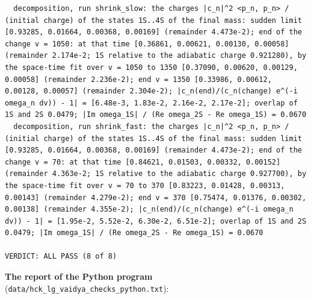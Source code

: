 \documentclass[
  10pt,
]{article}
\begin{document}
\begin{verbatim}
  decomposition, run shrink_slow: the charges |c_n|^2 <p_n, p_n> / (initial charge) of the states 1S..4S of the final mass: sudden limit [0.93285, 0.01664, 0.00368, 0.00169] (remainder 4.473e-2); end of the change v = 1050: at that time [0.36861, 0.00621, 0.00130, 0.00058] (remainder 2.174e-2; 1S relative to the adiabatic charge 0.921280), by the space-time fit over v = 1050 to 1350 [0.37090, 0.00620, 0.00129, 0.00058] (remainder 2.236e-2); end v = 1350 [0.33986, 0.00612, 0.00128, 0.00057] (remainder 2.304e-2); |c_n(end)/(c_n(change) e^(-i omega_n dv)) - 1| = [6.48e-3, 1.83e-2, 2.16e-2, 2.17e-2]; overlap of 1S and 2S 0.0479; |Im omega_1S| / (Re omega_2S - Re omega_1S) = 0.0670
  decomposition, run shrink_fast: the charges |c_n|^2 <p_n, p_n> / (initial charge) of the states 1S..4S of the final mass: sudden limit [0.93285, 0.01664, 0.00368, 0.00169] (remainder 4.473e-2); end of the change v = 70: at that time [0.84621, 0.01503, 0.00332, 0.00152] (remainder 4.363e-2; 1S relative to the adiabatic charge 0.927700), by the space-time fit over v = 70 to 370 [0.83223, 0.01428, 0.00313, 0.00143] (remainder 4.279e-2); end v = 370 [0.75474, 0.01376, 0.00302, 0.00138] (remainder 4.355e-2); |c_n(end)/(c_n(change) e^(-i omega_n dv)) - 1| = [1.95e-2, 5.52e-2, 6.30e-2, 6.51e-2]; overlap of 1S and 2S 0.0479; |Im omega_1S| / (Re omega_2S - Re omega_1S) = 0.0670

VERDICT: ALL PASS (8 of 8)
\end{verbatim}

\textbf{The report of the Python program}
(\texttt{data/hck\_lg\_vaidya\_checks\_python.txt}):
\end{document}
